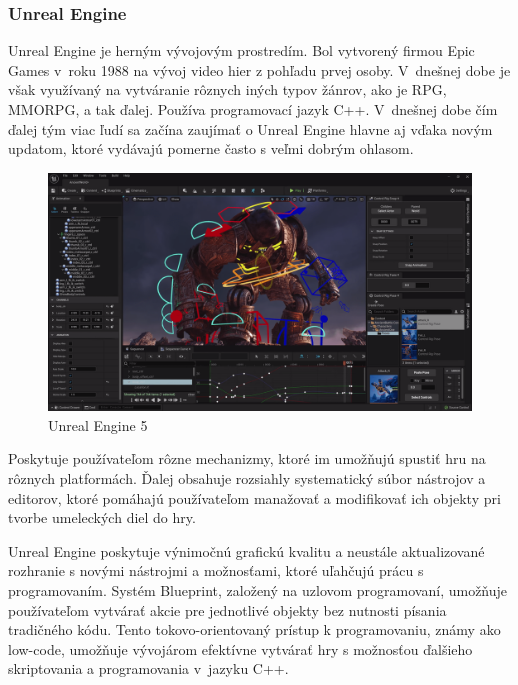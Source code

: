 \subsubsection{Unreal Engine}

Unreal Engine je herným vývojovým prostredím. Bol vytvorený firmou Epic Games v~roku 1988 na vývoj video hier z pohľadu prvej osoby. V~dnešnej dobe je však využívaný na vytváranie rôznych iných typov žánrov, ako je RPG, MMORPG, a tak ďalej. Používa programovací jazyk C++. V~dnešnej dobe čím ďalej tým viac ľudí sa začína zaujímať o Unreal Engine hlavne aj vďaka novým updatom, ktoré vydávajú pomerne často s veľmi dobrým ohlasom. %

\begin{figure}[h]
\centering
\includegraphics[width=1\textwidth]{img/unreal_engine_5.png}
\caption{Unreal Engine 5 \cite{unrealengine5}}
\label{fig:unrealengine5}
\end{figure}

Poskytuje používateľom rôzne mechanizmy, ktoré im umožňujú spustiť hru na rôznych platformách. Ďalej obsahuje rozsiahly systematický súbor nástrojov a editorov, ktoré pomáhajú používateľom manažovať a modifikovať ich objekty pri tvorbe umeleckých diel do hry. %

Unreal Engine poskytuje výnimočnú grafickú kvalitu a neustále aktualizované rozhranie s novými nástrojmi a možnosťami, ktoré uľahčujú prácu s programovaním. Systém Blueprint, založený na uzlovom programovaní, umožňuje používateľom vytvárať akcie pre jednotlivé objekty bez nutnosti písania tradičného kódu. Tento tokovo-orientovaný prístup k programovaniu, známy ako low-code, umožňuje vývojárom efektívne vytvárať hry s možnosťou ďalšieho skriptovania a programovania v~jazyku C++. %


